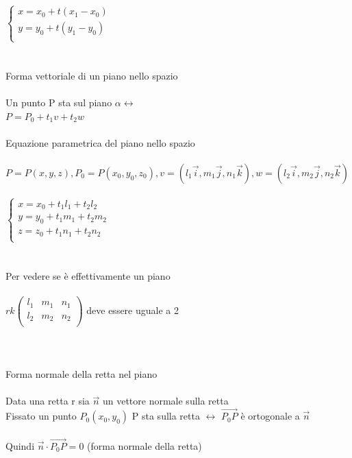 \documentclass{article}
\begin{document}
\(
\begin{cases}
    x=x_0+t(x_1-x_0)\\
    y=y_0+t(y_1-y_0)\\
\end{cases}
\)\\\\\\
{\large Forma vettoriale di un piano nello spazio}\\\\
Un punto P sta sul piano \(\alpha\)\(\leftrightarrow\)\\
\(P=P_0+t_1v+t_2w\)\\\\
Equazione parametrica del piano nello spazio\\\\
\(P=P(x,y,z),P_0=P(x_0,y_0,z_0),v=(l_1\vec{i},m_1\vec{j},n_1\vec{k}),w=(l_2\vec{i},m_2\vec{j},n_2\vec{k})\)\\\\
\(
\begin{cases}
    x=x_0+t_1l_1+t_2l_2\\
    y=y_0+t_1m_1+t_2m_2\\
    z=z_0+t_1n_1+t_2n_2\\
\end{cases}
\)\\\\\\
Per vedere se è effettivamente un piano\\\\
\(rk\left(
\begin{array}{ccc}
    l_1 & m_1 & n_1\\
    l_2 & m_2 & n_2\\
\end{array}
\right)\) deve essere uguale a 2\\\\\\\\
{\large Forma normale della retta nel piano}\\\\
Data una retta r sia \(\vec{n}\) un vettore normale sulla retta\\
Fissato un punto \(P_0(x_0,y_0)\) P sta sulla retta \(\leftrightarrow\) \(\vec{P_0P}\) è ortogonale a \(\vec{n}\)\\\\
Quindi \(\vec{n}\cdot\vec{P_0P}=0\) (forma normale della retta)\\\\
\end{document}
